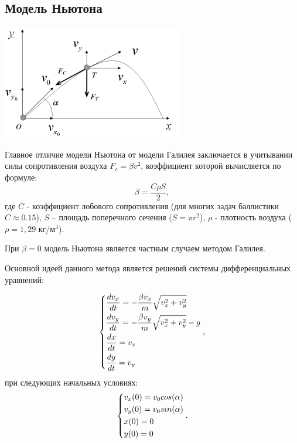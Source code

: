 \documentclass[a4paper, 12pt]{article}   	%
\begin{document}
\subsection{Модель Ньютона}
    \begin{center}
        \includegraphics[height=5cm]{newton_model}
    \end{center}
    Главное отличие модели Ньютона от модели Галилея заключается в учитывании силы сопротивления воздуха $F_c = \beta v^2$, коэффициент которой вычисляется по формуле:
    \begin{equation}
        \beta = \frac{C \rho S}{2},
    \end{equation}
    где $C$ - коэффициент лобового сопротивления (для многих задач баллистики $C \approx 0.15$), $S$ – площадь поперечного сечения ($S = \pi r^2$), $\rho$ - плотность воздуха ($\rho=1,29$ кг/м$^3$). 
    
    При $\beta = 0$ модель Ньютона является частным случаем методом Галилея.
    
    Основной идеей данного метода является решений системы дифференциальных уравнений:
    
    \begin{equation}
        \begin{dcases*}
            \frac{dv_x}{dt} = - \frac{\beta v_x}{m} \sqrt{v_x^2 + v_y^2} \\
            \frac{dv_y}{dt} = - \frac{\beta v_y}{m} \sqrt{v_x^2 + v_y^2} - g \\
            \frac{dx}{dt} = v_x \\
            \frac{dy}{dt} = v_y
        \end{dcases*},
    \end{equation}
    при следующих начальных условиях:
    \begin{equation}
        \begin{dcases*}
            v_x(0) = v_0 cos(\alpha) \\
            v_y(0) = v_0 sin(\alpha) \\
            x(0) = 0 \\
            y(0) = 0
        \end{dcases*}.
    \end{equation}
\end{document}
